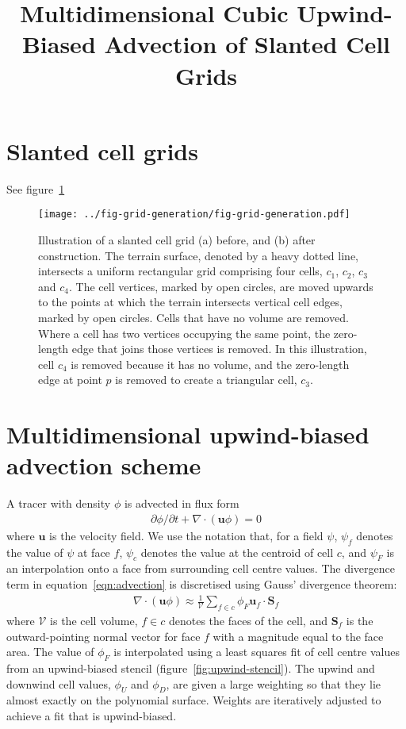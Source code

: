 \documentclass{article}
\title{Multidimensional Cubic Upwind-Biased Advection of Slanted Cell Grids}
\begin{document}
\maketitle

\section{Slanted cell grids}
See figure~\ref{fig:grid-generation}
\begin{figure}
	\centering
	\texttt{[image: ../fig-grid-generation/fig-grid-generation.pdf]}
	\caption{Illustration of a slanted cell grid (a) before, and (b) after construction.
	The terrain surface, denoted by a heavy dotted line, intersects a uniform rectangular grid comprising four cells, $c_1$, $c_2$, $c_3$ and $c_4$.  The cell vertices, marked by open circles, are moved upwards to the points at which the terrain intersects vertical cell edges, marked by open circles.  Cells that have no volume are removed.  Where a cell has two vertices occupying the same point, the zero-length edge that joins those vertices is removed.  In this illustration, cell $c_4$ is removed because it has no volume, and the zero-length edge at point $p$ is removed to create a triangular cell, $c_3$.}
	\label{fig:grid-generation}
\end{figure}
\clearpage

\section{Multidimensional upwind-biased advection scheme}
A tracer with density $\phi$ is advected in flux form
\begin{align}
	\partial \phi / \partial t + \nabla \cdot \left( \mathbf{u} \phi \right) = 0 \label{eqn:advection}
\end{align}
where $\mathbf{u}$ is the velocity field.  We use the notation that, for a field $\psi$, $\psi_f$ denotes the value of $\psi$ at face $f$, $\psi_c$ denotes the value at the centroid of cell $c$, and $\psi_F$ is an interpolation onto a face from surrounding cell centre values.  The divergence term in equation~\ref{eqn:advection} is discretised using Gauss' divergence theorem:
\begin{align}
	\nabla \cdot \left( \mathbf{u} \phi \right) \approx \frac{1}{\mathcal{V}} \sum_{f \in c} \phi_F \mathbf{u}_f \cdot \mathbf{S}_f
\end{align}
where $\mathcal{V}$ is the cell volume, $f \in c$ denotes the faces of the cell, and $\mathbf{S}_f$ is the outward-pointing normal vector for face $f$ with a magnitude equal to the face area.
The value of $\phi_F$ is interpolated using a least squares fit of cell centre values from an upwind-biased stencil (figure~\ref{fig:upwind-stencil}).  The upwind and downwind cell values, $\phi_U$ and $\phi_D$, are given a large weighting so that they lie almost exactly on the polynomial surface.  Weights are iteratively adjusted to achieve a fit that is upwind-biased.
\end{document}
